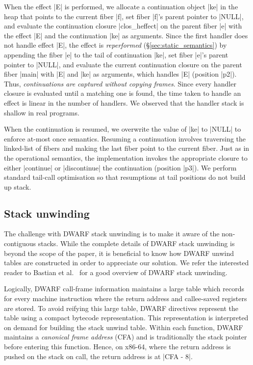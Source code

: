 \documentclass[sigplan,10pt,review,anonymous]{acmart}\settopmatter{printfolios=true,printccs=false,printacmref=false}
\begin{document}
When the effect |E| is performed, we allocate a continuation object |ke| in the
heap that points to the current fiber |f|, set fiber |f|'s parent pointer to
|NULL|, and evaluate the continuation closure |clos_heffect| on the parent
fiber |e| with the effect |E| and the continuation |ke| as arguments. Since the
first handler does not handle effect |E|, the effect is \emph{reperformed}
(\S\ref{sec:static_semantics}) by appending the fiber |e| to the tail of
continuation |ke|, set fiber |e|'s parent pointer to |NULL|, and evaluate the
current continuation closure on the parent fiber |main| with |E| and |ke| as
arguments, which handles |E| (position |p2|). Thus, \emph{continuations are
captured without copying frames}. Since every handler closure is evaluated
until a matching one is found, the time taken to handle an effect is linear in
the number of handlers. We observed that the handler stack is shallow in
real programs.

When the continuation is resumed, we overwrite the value of |ke| to |NULL| to
enforce at-most once semantics. Resuming a continuation involves traversing the
linked-list of fibers and making the last fiber point to the current fiber.
Just as in the operational semantics, the implementation invokes the
appropriate closure to either |continue| or |discontinue| the continuation
(position |p3|). We perform standard tail-call optimisation so that resumptions
at tail positions do not build up stack.

\vspace{-3mm}
\subsection{Stack unwinding}

The challenge with DWARF stack unwinding is to make it aware of the
non-contiguous stacks. While the complete details of DWARF stack unwinding is
beyond the scope of the paper, it is beneficial to know how DWARF unwind tables
are constructed in order to appreciate our solution. We refer the interested
reader to Bastian et al.~\cite{Bastian19} for a good overview of DWARF stack
unwinding.

Logically, DWARF call-frame information maintains a large table which records
for every machine instruction where the return address and callee-saved
registers are stored. To avoid reifying this large table, DWARF directives
represent the table using a compact bytecode representation. This representation
is interpreted on demand for building the stack unwind table. Within each
function, DWARF maintains a \emph{canonical frame address} (CFA) and is
traditionally the stack pointer before entering this function. Hence, on x86-64,
where the return address is pushed on the stack on call, the return address is
at |CFA - 8|.
\end{document}
